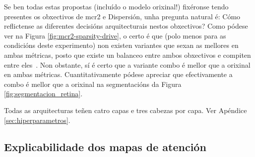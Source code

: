 Se ben todas estas propostas (incluído o modelo orixinal!\cite{crate}) fixéronse tendo presentes os obxectivos de \acrshort{mcr2} e Dispersión, unha pregunta natural é: Cómo reflictense as diferentes decisións arquitecturais nestos obxectivos? Como pódese ver na Figura \ref{fig:mcr2-sparsity-drive}, o certo é que (polo menos para as condicións deste experimento) non existen variantes que sexan as mellores en ambas métricas, posto que existe un balanceo entre ambos obxectivos e compiten entre eles~\cite{crate}. Non obstante, sí é certo que a variante combo é mellor que a orixinal en ambas métricas. Cuantitativamente pódese apreciar que efectivamente a combo é mellor que a orixinal na segmentacións da Figura \ref{fig:segmentacion_retina}.

Todas as arquitecturas teñen catro capas e tres cabezas por capa. Ver Apéndice \ref{sec:hiperparametros}.

\subsection{Explicabilidade dos mapas de atención}
\label{sec:res-atencion-drive}


